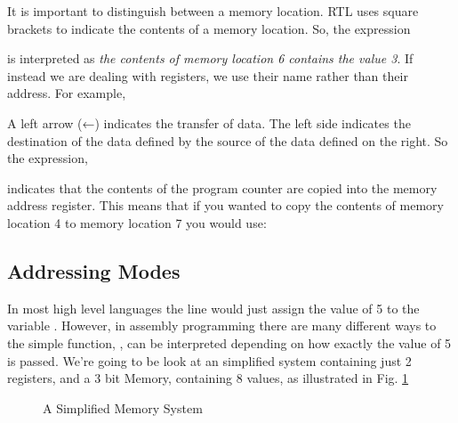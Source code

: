 				It is important to distinguish between a memory location. RTL uses square brackets to indicate the contents of a memory location. So, the expression 
				

				is interpreted as \textit{the contents of memory location 6 contains the value 3}. If instead we are dealing with registers, we use their name rather than their address. For example,
				
				
				A left arrow (←) indicates the transfer of data. The left side indicates the destination of the data defined by the source of the data defined on the right. So the expression, 
				
				\RTL{[MAR] |$\gets$| [PC]}
				
				indicates that the contents of the program counter are copied into the memory address register. This means that if you wanted to copy the contents of memory location 4 to memory location 7 you would use:
				
				\RTL{[7] |$\gets$| [4]}
				
	
		\subsection{Addressing Modes}
			In most high level languages the line  would just assign the value of 5 to the variable . However, in assembly programming there are many different ways to the simple function, , can be interpreted depending on how exactly the value of 5 is passed. We're going to be look at an simplified system containing just 2 registers, and a 3 bit Memory, containing 8 values, as illustrated in Fig. \ref{fig:3bitMemoryTape}
			
			\begin{figure}[h!]
				\begin{center}
				\end{center}
				\caption{\label{fig:3bitMemoryTape} A Simplified Memory System}
			\end{figure}
			
